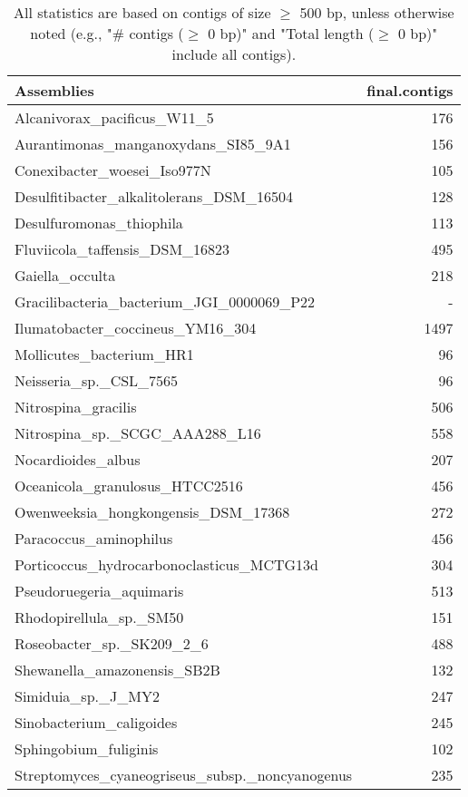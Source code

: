 \documentclass[12pt,a4paper]{article}
\begin{document}
\begin{table}[ht]
\begin{center}
\caption{All statistics are based on contigs of size $\geq$ 500 bp, unless otherwise noted (e.g., "\# contigs ($\geq$ 0 bp)" and "Total length ($\geq$ 0 bp)" include all contigs).}
\begin{tabular}{|l*{1}{|r}|}
\hline
Assemblies & final.contigs \\ \hline
Alcanivorax\_pacificus\_W11\_5 & 176 \\ \hline
Aurantimonas\_manganoxydans\_SI85\_9A1 & 156 \\ \hline
Conexibacter\_woesei\_Iso977N & 105 \\ \hline
Desulfitibacter\_alkalitolerans\_DSM\_16504 & 128 \\ \hline
Desulfuromonas\_thiophila & 113 \\ \hline
Fluviicola\_taffensis\_DSM\_16823 & 495 \\ \hline
Gaiella\_occulta & 218 \\ \hline
Gracilibacteria\_bacterium\_JGI\_0000069\_P22 & - \\ \hline
Ilumatobacter\_coccineus\_YM16\_304 & 1497 \\ \hline
Mollicutes\_bacterium\_HR1 & 96 \\ \hline
Neisseria\_sp.\_CSL\_7565 & 96 \\ \hline
Nitrospina\_gracilis & 506 \\ \hline
Nitrospina\_sp.\_SCGC\_AAA288\_L16 & 558 \\ \hline
Nocardioides\_albus & 207 \\ \hline
Oceanicola\_granulosus\_HTCC2516 & 456 \\ \hline
Owenweeksia\_hongkongensis\_DSM\_17368 & 272 \\ \hline
Paracoccus\_aminophilus & 456 \\ \hline
Porticoccus\_hydrocarbonoclasticus\_MCTG13d & 304 \\ \hline
Pseudoruegeria\_aquimaris & 513 \\ \hline
Rhodopirellula\_sp.\_SM50 & 151 \\ \hline
Roseobacter\_sp.\_SK209\_2\_6 & 488 \\ \hline
Shewanella\_amazonensis\_SB2B & 132 \\ \hline
Simiduia\_sp.\_J\_MY2 & 247 \\ \hline
Sinobacterium\_caligoides & 245 \\ \hline
Sphingobium\_fuliginis & 102 \\ \hline
Streptomyces\_cyaneogriseus\_subsp.\_noncyanogenus & 235 \\ \hline

\end{tabular}
\end{center}
\end{table}
\end{document}
